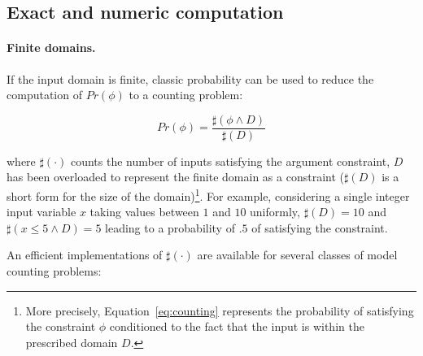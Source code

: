 
\subsection{Exact and numeric computation}\label{sec:computingprobabilitiesExact}

\paragraph{Finite domains.} 

If the input domain is finite, classic probability can be used to reduce the computation of $Pr(\phi)$ to a counting problem:

\begin{equation}\label{eq:counting}
	Pr(\phi) = \frac{\sharp(\phi \land D)}{\sharp(D)}
\end{equation}

\noindent where $\sharp(\cdot)$ counts the number of inputs satisfying the argument constraint, $D$ has been overloaded to represent the finite domain as a constraint ($\sharp(D)$ is a short form for the size of the domain)\footnote{More precisely, Equation~\eqref{eq:counting} represents the probability of satisfying the constraint $\phi$ conditioned to the fact that the input is within the prescribed domain $D$.}. For example, considering a single integer input variable $x$ taking values between $1$ and $10$ uniformly, $\sharp(D)=10$ and $\sharp(x\leq5 \land D)=5$ leading to a probability of $.5$ of satisfying the constraint.

An efficient implementations of $\sharp(\cdot)$ are available for several classes of model counting problems:

